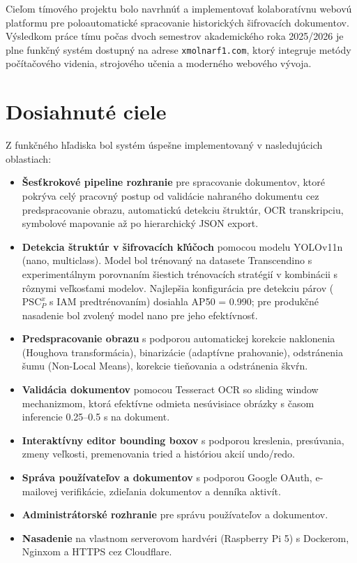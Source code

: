 Cieľom tímového projektu bolo navrhnúť a implementovať kolaboratívnu webovú platformu pre poloautomatické spracovanie historických šifrovacích dokumentov. Výsledkom práce tímu počas dvoch semestrov akademického roka 2025/2026 je plne funkčný systém dostupný na adrese \texttt{xmolnarf1.com}, ktorý integruje metódy počítačového videnia, strojového učenia a moderného webového vývoja.

\section*{Dosiahnuté ciele}

Z funkčného hľadiska bol systém úspešne implementovaný v nasledujúcich oblastiach:

\begin{itemize}
    \item \textbf{Šesťkrokové pipeline rozhranie} pre spracovanie dokumentov, ktoré pokrýva celý pracovný postup od validácie nahraného dokumentu cez predspracovanie obrazu, automatickú detekciu štruktúr, OCR transkripciu, symbolové mapovanie až po hierarchický JSON export.
    \item \textbf{Detekcia štruktúr v šifrovacích kľúčoch} pomocou modelu YOLOv11n (nano, multiclass). Model bol trénovaný na datasete Transcendino s experimentálnym porovnaním šiestich trénovacích stratégií v kombinácii s rôznymi veľkosťami modelov. Najlepšia konfigurácia pre detekciu párov ($\mathrm{PSC}_{P}^{x}$ s IAM predtrénovaním) dosiahla AP50 = 0.990; pre produkčné nasadenie bol zvolený model nano pre jeho efektívnosť.
    \item \textbf{Predspracovanie obrazu} s podporou automatickej korekcie naklonenia (Houghova transformácia), binarizácie (adaptívne prahovanie), odstránenia šumu (Non-Local Means), korekcie tieňovania a odstránenia škvŕn.
    \item \textbf{Validácia dokumentov} pomocou Tesseract OCR so sliding window mechanizmom, ktorá efektívne odmieta nesúvisiace obrázky s časom inferencie 0.25–0.5 s na dokument.
    \item \textbf{Interaktívny editor bounding boxov} s podporou kreslenia, presúvania, zmeny veľkosti, premenovania tried a históriou akcií undo/redo.
    \item \textbf{Správa používateľov a dokumentov} s podporou Google OAuth, e-mailovej verifikácie, zdieľania dokumentov a denníka aktivít.
    \item \textbf{Administrátorské rozhranie} pre správu používateľov a dokumentov.
    \item \textbf{Nasadenie} na vlastnom serverovom hardvéri (Raspberry Pi 5) s Dockerom, Nginxom a HTTPS cez Cloudflare.
\end{itemize}

